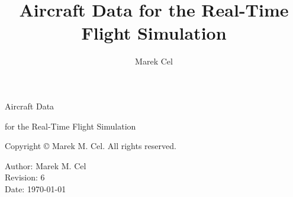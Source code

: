 \documentclass[12pt,a4paper]{report}
\title{Aircraft Data for the Real-Time Flight Simulation}
\author{Marek Cel}
\date{}
\begin{document}
  
  \begin{titlepage}
    \centering
    {\huge Aircraft Data \par for the Real-Time Flight Simulation\par}
  \end{titlepage}
  

  \noindent Copyright \copyright{} \the\year{} Marek M. Cel. All rights reserved.

  \noindent Author: Marek M. Cel \\
  Revision: 6 \\
  Date: \today

  
  
  {
    \clearpage
    \setlength{\parskip}{0em}
    \tableofcontents
  }

  
  
  
  
  
  
  
  \clearpage
   
  
  
\end{document}
